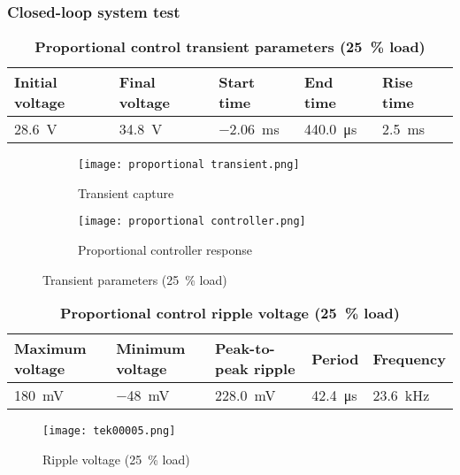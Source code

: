 \subsubsection{Closed-loop system test}
\begin{table}[H]
    \centering
    \caption{\textbf{Proportional control transient parameters (\qty{25}{\percent} load)}}
    \begin{tabularx}{\columnwidth}{|X|X|X|X|X|}
        \hline
        Initial voltage   & Final voltage     & Start time       & End time         & Rise time      \\
        \hline
        \qty{28.6}{\volt} & \qty{34.8}{\volt} & \qty{-2.06}{\ms} & \qty{440.0}{\us} & \qty{2.5}{\ms} \\
        \hline
    \end{tabularx}
\end{table}
\begin{figure}[H]
    \begin{subfigure}{0.5\textwidth}
        \texttt{[image: proportional transient.png]}
        \caption{Transient capture}
    \end{subfigure}
    \hfill
    \begin{subfigure}{0.5\textwidth}
        \texttt{[image: proportional controller.png]}
        \caption{Proportional controller response}
    \end{subfigure}
    \caption{Transient parameters (\qty{25}{\percent} load)}
    \label{fig:controllerresponse}
\end{figure}

\begin{table}[H]
    \centering
    \caption{\textbf{Proportional control ripple voltage (\qty{25}{\percent} load)}}
    \begin{tabularx}{\columnwidth}{|X|X|X|X|X|}
        \hline
        Maximum voltage        & Minimum voltage        & Peak-to-peak ripple & Period          & Frequency        \\
        \hline
        \qty{180}{\milli\volt} & \qty{-48}{\milli\volt} & \qty{228.0}{\mV}    & \qty{42.4}{\us} & \qty{23.6}{\kHz} \\
        \hline
    \end{tabularx}
\end{table}
\begin{figure}[H]
    \centering
    \texttt{[image: tek00005.png]}
    \caption{Ripple voltage (\qty{25}{\percent} load)}
\end{figure}

